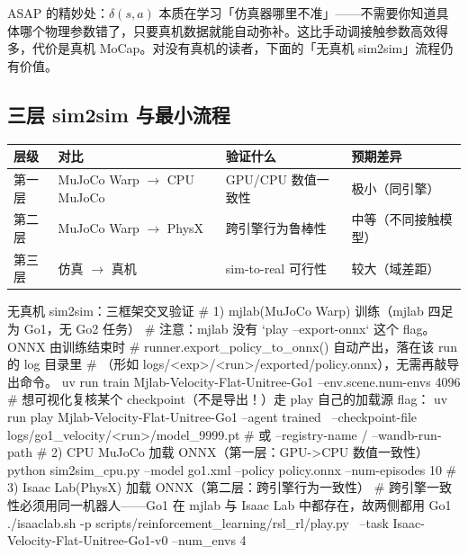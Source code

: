 \begin{insight}\label{ins:rlmc-phys-asap}
ASAP 的精妙处：$\delta(s,a)$ 本质在学习「仿真器哪里不准」——不需要你知道具体哪个物理参数错了，只要真机数据就能自动弥补。这比手动调接触参数高效得多，代价是真机 MoCap。对没有真机的读者，下面的「无真机 sim2sim」流程仍有价值。
\end{insight}

\subsection{三层 sim2sim 与最小流程}

\begin{center}
\small
\begin{tabular}{@{}llll@{}}
\toprule
层级 & 对比 & 验证什么 & 预期差异 \\
\midrule
第一层 & MuJoCo Warp $\to$ CPU MuJoCo & GPU/CPU 数值一致性 & 极小（同引擎） \\
第二层 & MuJoCo Warp $\to$ PhysX & 跨引擎行为鲁棒性 & 中等（不同接触模型） \\
第三层 & 仿真 $\to$ 真机 & sim-to-real 可行性 & 较大（域差距） \\
\bottomrule
\end{tabular}
\end{center}

\begin{codebox}[bash]{无真机 sim2sim：三框架交叉验证}
# 1) mjlab(MuJoCo Warp) 训练（mjlab 四足为 Go1，无 Go2 任务）
#    注意：mjlab 没有 `play --export-onnx` 这个 flag。ONNX 由训练结束时
#    runner.export_policy_to_onnx() 自动产出，落在该 run 的 log 目录里
#    （形如 logs/<exp>/<run>/exported/policy.onnx），无需再敲导出命令。
uv run train Mjlab-Velocity-Flat-Unitree-Go1 --env.scene.num-envs 4096
# 想可视化复核某个 checkpoint（不是导出！）走 play 自己的加载源 flag：
uv run play  Mjlab-Velocity-Flat-Unitree-Go1 --agent trained \
    --checkpoint-file logs/go1_velocity/<run>/model_9999.pt   # 或 --registry-name / --wandb-run-path
# 2) CPU MuJoCo 加载 ONNX（第一层：GPU->CPU 数值一致性）
python sim2sim_cpu.py --model go1.xml --policy policy.onnx --num-episodes 10
# 3) Isaac Lab(PhysX) 加载 ONNX（第二层：跨引擎行为一致性）
#    跨引擎一致性必须用同一机器人——Go1 在 mjlab 与 Isaac Lab 中都存在，故两侧都用 Go1
./isaaclab.sh -p scripts/reinforcement_learning/rsl_rl/play.py \
    --task Isaac-Velocity-Flat-Unitree-Go1-v0 --num_envs 4
\end{codebox}

